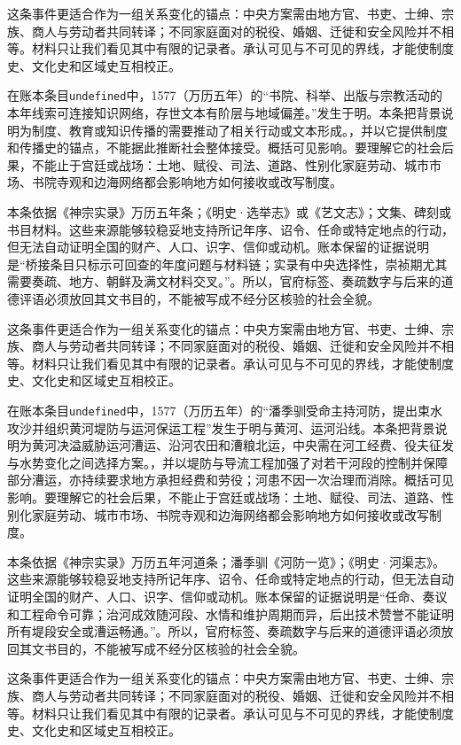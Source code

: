 这条事件更适合作为一组关系变化的锚点：中央方案需由地方官、书吏、士绅、宗族、商人与劳动者共同转译；不同家庭面对的税役、婚姻、迁徙和安全风险并不相等。材料只让我们看见其中有限的记录者。承认可见与不可见的界线，才能使制度史、文化史和区域史互相校正。

在账本条目\texttt{undefined}中，1577（万历五年）的“书院、科举、出版与宗教活动的本年线索可连接知识网络，存世文本有阶层与地域偏差。”发生于明。本条把背景说明为制度、教育或知识传播的需要推动了相关行动或文本形成。，并以它提供制度和传播史的锚点，不能据此推断社会整体接受。概括可见影响。要理解它的社会后果，不能止于宫廷或战场：土地、赋役、司法、道路、性别化家庭劳动、城市市场、书院寺观和边海网络都会影响地方如何接收或改写制度。

本条依据《神宗实录》万历五年条；《明史·选举志》或《艺文志》；文集、碑刻或书目材料。这些来源能够较稳妥地支持所记年序、诏令、任命或特定地点的行动，但无法自动证明全国的财产、人口、识字、信仰或动机。账本保留的证据说明是“桥接条目只标示可回查的年度问题与材料链；实录有中央选择性，崇祯期尤其需要奏疏、地方、朝鲜及满文材料交叉。”。所以，官府标签、奏疏数字与后来的道德评语必须放回其文书目的，不能被写成不经分区核验的社会全貌。

这条事件更适合作为一组关系变化的锚点：中央方案需由地方官、书吏、士绅、宗族、商人与劳动者共同转译；不同家庭面对的税役、婚姻、迁徙和安全风险并不相等。材料只让我们看见其中有限的记录者。承认可见与不可见的界线，才能使制度史、文化史和区域史互相校正。

在账本条目\texttt{undefined}中，1577（万历五年）的“潘季驯受命主持河防，提出束水攻沙并组织黄河堤防与运河保运工程”发生于明与黄河、运河沿线。本条把背景说明为黄河决溢威胁运河漕运、沿河农田和漕粮北运，中央需在河工经费、役夫征发与水势变化之间选择方案。，并以堤防与导流工程加强了对若干河段的控制并保障部分漕运，亦持续要求地方承担经费和劳役；河患不因一次治理而消除。概括可见影响。要理解它的社会后果，不能止于宫廷或战场：土地、赋役、司法、道路、性别化家庭劳动、城市市场、书院寺观和边海网络都会影响地方如何接收或改写制度。

本条依据《神宗实录》万历五年河道条；潘季驯《河防一览》；《明史·河渠志》。这些来源能够较稳妥地支持所记年序、诏令、任命或特定地点的行动，但无法自动证明全国的财产、人口、识字、信仰或动机。账本保留的证据说明是“任命、奏议和工程命令可靠；治河成效随河段、水情和维护周期而异，后出技术赞誉不能证明所有堤段安全或漕运畅通。”。所以，官府标签、奏疏数字与后来的道德评语必须放回其文书目的，不能被写成不经分区核验的社会全貌。

这条事件更适合作为一组关系变化的锚点：中央方案需由地方官、书吏、士绅、宗族、商人与劳动者共同转译；不同家庭面对的税役、婚姻、迁徙和安全风险并不相等。材料只让我们看见其中有限的记录者。承认可见与不可见的界线，才能使制度史、文化史和区域史互相校正。


